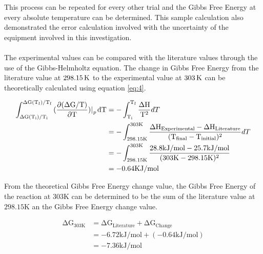 \documentclass{article}
\begin{document}
\noindent
This process can be repeated for every other trial and the Gibbs Free Energy at every absolute temperature can be determined. This sample calculation also demonstrated the error calculation involved with the uncertainty of the equipment involved in this investigation. \\ \\

\noindent
The experimental values can be compared with the literature values through the use of the Gibbs-Helmholtz equation. The change in Gibbs Free Energy from the literature value at $\ce{298.15K}$ to the experimental value at $\ce{303K}$ can be theoretically calculated using equation \ref{eq:4}.
\begin{tcolorbox}[title=Calculation of Theoretical Gibbs Free Energy Change from Temperature ($\ce{\Delta G_{Change}}$)]
\begin{equation}
    \begin{split}
        \int_{\Delta \mathrm{G(T_i)/T_i}}^{\Delta \mathrm{G(T_f)/T_f}}{(\frac{\mathrm{\partial (\Delta G/T)}}{\mathrm{\partial T}})\ce{|_p dT}} &= -\int_{\mathrm{T_i}}^{\mathrm{T_f}} \frac{\mathrm{\Delta H}}{\mathrm{T^2}} dT \\
        &= -\int_{298.15 \mathrm{K}}^{303\mathrm{K}} \frac{\ce{\Delta H_{Experimental} - \Delta H_{Literature}}}{\ce{(T_{final} - T_{initial}})^2} dT \\
        &= -\int_{298.15\mathrm{K}}^{303\mathrm{K}} \frac{28.8 \mathrm{kJ/mol} - 25.7 \mathrm{kJ/mol}}{(303\mathrm{K} - 298.15\mathrm{K})^2} \\
        &= -0.64 \mathrm{KJ/mol}
    \end{split}
\end{equation}
\end{tcolorbox}
\noindent
From the theoretical Gibbs Free Energy change value, the Gibbs Free Energy of the reaction at $\mathrm{303K}$ can be determined to be the sum of the literature value at $\mathrm{298.15K}$ an the Gibbs Free Energy change value.
\begin{tcolorbox}[title=Calculation of Theoretical Gibbs Free Energy at $\mathrm{303K}$]
\begin{equation}
    \begin{split}
        \mathrm{\Delta G_{303K}} &= \mathrm{\Delta G_{Literature}} + \mathrm{\Delta G_{Change}} \\ 
        &= -6.72 \mathrm{kJ/mol} + (-0.64 \mathrm{kJ/mol}) \\
        &= -7.36 \mathrm{kJ/mol}
    \end{split}
\end{equation}
\end{tcolorbox}
\end{document}
